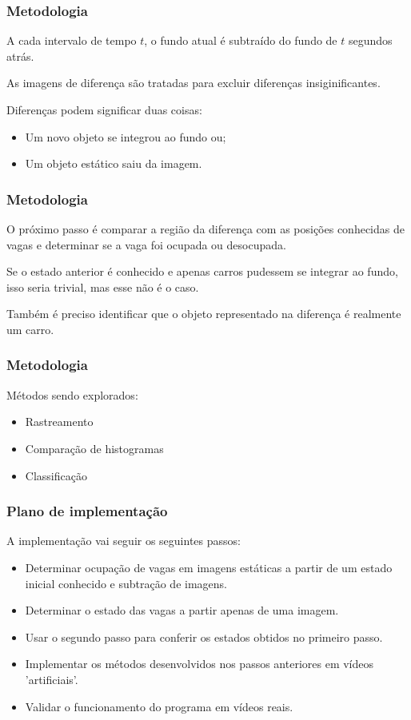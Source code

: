 \documentclass{beamer}
\begin{document}
\begin{frame}
\frametitle{Metodologia}
   A cada intervalo de tempo $t$, o fundo atual é subtraído do fundo de $t$ segundos atrás.

   As imagens de diferença são tratadas para excluir diferenças insiginificantes.

   Diferenças podem significar duas coisas:
   \begin{itemize}
        \item Um novo objeto se integrou ao fundo ou;
        \item Um objeto estático saiu da imagem.
    \end{itemize}
\end{frame}

\begin{frame}
\frametitle{Metodologia}
   O próximo passo é comparar a região da diferença com as posições conhecidas de vagas e determinar se a vaga foi ocupada ou desocupada.

   Se o estado anterior é conhecido e apenas carros pudessem se integrar ao fundo, isso seria trivial, mas esse não é o caso.

    Também é preciso identificar que o objeto representado na diferença é realmente um carro.
\end{frame}

\begin{frame}
\frametitle{Metodologia}
   Métodos sendo explorados:
   \begin{itemize}
     \item  Rastreamento
     \item  Comparação de histogramas
     \item  Classificação
   \end{itemize}
\end{frame}

\begin{frame}
\frametitle{Plano de implementação}
   A implementação vai seguir os seguintes passos:
   \begin{itemize}
     \item  Determinar ocupação de vagas em imagens estáticas a partir de um estado inicial conhecido e subtração de imagens.
     \item  Determinar o estado das vagas a partir apenas de uma imagem.
     \item  Usar o segundo passo para conferir os estados obtidos no primeiro passo.
     \item  Implementar os métodos desenvolvidos nos passos anteriores em vídeos 'artificiais'.
     \item  Validar o funcionamento do programa em vídeos reais.
   \end{itemize}
\end{frame}
\end{document}

